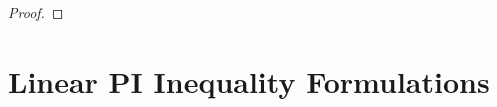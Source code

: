 \documentclass[letterpaper, 10 pt, conference]{ieeeconf}
\newcommand{\norm}[1]{\left\lVert #1 \right\rVert}
\theoremstyle{definition}
\begin{document}
\begin{proof}

\end{proof}


\section{Linear PI Inequality Formulations}
\end{document}
